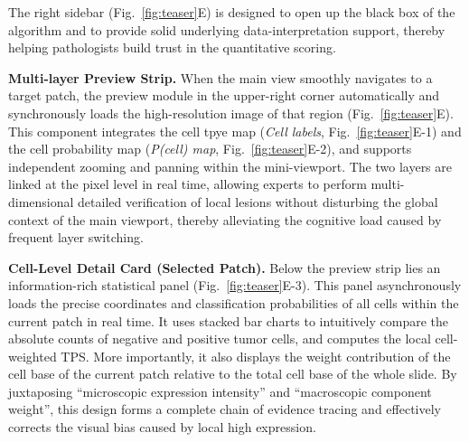 \documentclass[journal]{vgtc}                     %
\begin{document}
The right sidebar (Fig.~\ref{fig:teaser}E) is designed to open up the black box of the algorithm and to provide solid underlying data-interpretation support, thereby helping pathologists build trust in the quantitative scoring.

\textbf{Multi-layer Preview Strip.} When the main view smoothly navigates to a target patch, the preview module in the upper-right corner automatically and synchronously loads the high-resolution image of that region (Fig.~\ref{fig:teaser}E). This component integrates the cell tpye map (\textit{Cell labels}, Fig.~\ref{fig:teaser}E-1) and the cell probability map (\textit{P(cell) map}, Fig.~\ref{fig:teaser}E-2), and supports independent zooming and panning within the mini-viewport. The two layers are linked at the pixel level in real time, allowing experts to perform multi-dimensional detailed verification of local lesions without disturbing the global context of the main viewport, thereby alleviating the cognitive load caused by frequent layer switching.

\textbf{Cell-Level Detail Card (Selected Patch).} Below the preview strip lies an information-rich statistical panel (Fig.~\ref{fig:teaser}E-3). This panel asynchronously loads the precise coordinates and classification probabilities of all cells within the current patch in real time. It uses stacked bar charts to intuitively compare the absolute counts of negative and positive tumor cells, and computes the local cell-weighted TPS. More importantly, it also displays the weight contribution of the cell base of the current patch relative to the total cell base of the whole slide. By juxtaposing ``microscopic expression intensity'' and ``macroscopic component weight'', this design forms a complete chain of evidence tracing and effectively corrects the visual bias caused by local high expression.
\end{document}
